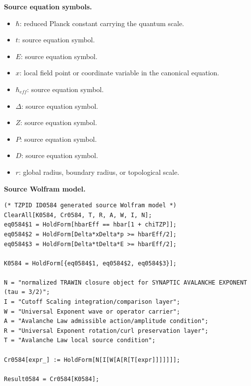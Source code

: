 \begin{minipage}[t]{0.49\linewidth}
\begingroup
\small
\raggedright
\textbf{Source equation symbols.}\par
\begin{itemize}[leftmargin=1.35em,itemsep=1pt,topsep=1pt,parsep=0pt]
    \item $\hbar$: reduced Planck constant carrying the quantum scale.
    \item $t$: source equation symbol.
    \item $E$: source equation symbol.
    \item $x$: local field point or coordinate variable in the canonical equation.
    \item $\hbar_{eff}$: source equation symbol.
    \item $\Delta$: source equation symbol.
    \item $Z$: source equation symbol.
    \item $P$: source equation symbol.
    \item $D$: source equation symbol.
    \item $r$: global radius, boundary radius, or topological scale.
\end{itemize}
\endgroup
\end{minipage}\hfill
\begin{minipage}[t]{0.47\linewidth}
\begingroup
\scriptsize
\raggedright
\textbf{Source Wolfram model.}\par
\begin{Verbatim}[fontsize=\tiny,breaklines=true,breakanywhere=true]
(* TZPID ID0584 generated source Wolfram model *)
ClearAll[K0584, Cr0584, T, R, A, W, I, N];
eq0584$1 = HoldForm[hbarEff == hbar[1 + chiTZP]];
eq0584$2 = HoldForm[Delta*xDelta*p >= hbarEff/2];
eq0584$3 = HoldForm[Delta*tDelta*E >= hbarEff/2];

K0584 = HoldForm[{eq0584$1, eq0584$2, eq0584$3}];

N = "normalized TRAWIN closure object for SYNAPTIC AVALANCHE EXPONENT (tau = 3/2)";
I = "Cutoff Scaling integration/comparison layer";
W = "Universal Exponent wave or operator carrier";
A = "Avalanche Law admissible action/amplitude condition";
R = "Universal Exponent rotation/curl preservation layer";
T = "Avalanche Law local source condition";

Cr0584[expr_] := HoldForm[N[I[W[A[R[T[expr]]]]]]];

Result0584 = Cr0584[K0584];
\end{Verbatim}
\endgroup
\end{minipage}

